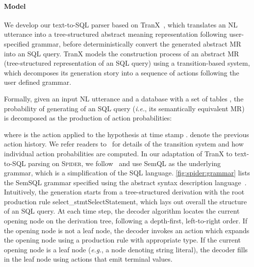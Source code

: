 \documentclass[11pt,a4paper]{article}
\renewcommand{\tt}[1]{\fontfamily{cmtt}\selectfont #1}
\newcommand{\eg}{\hbox{\emph{e.g.}}\xspace}
\newcommand{\ie}{\hbox{\emph{i.e.}}\xspace}
\def\spider/{\textsc{Spider}}
\begin{document}
\paragraph{Model} We develop our text-to-SQL parser based on TranX~\cite{yin18tranx}, which translates an NL utterance into a tree-structured abstract meaning representation following user-specified grammar, before deterministically convert the generated abstract MR into an SQL query. TranX models the construction process of an abstract MR (tree-structured representation of an SQL query) using a transition-based system, which decomposes its generation story into a sequence of actions following the user defined grammar.

Formally, given an input NL utterance  and a database with a set of tables , the probability of generating of an SQL query (\ie, its semantically equivalent MR) 
 is decomposed as the production of action probabilities:

where  is the action applied to the hypothesis at time stamp .  denote the previous action history. 
We refer readers to~\citet{yin18tranx} for details of the transition system and how individual action probabilities are computed. 
In our adaptation of TranX to text-to-SQL parsing on \spider/, 
we follow~\citet{Guo2019TowardsCT} and use SemQL as the underlying grammar, which is a simplification of the SQL language. 
\autoref{fig:spider:grammar} lists the SemSQL grammar specified using the abstract syntax description language~\cite{wang97asdl}.
Intuitively, the generation starts from a tree-structured derivation with the root production rule {\tt select\_stmt}{\tt SelectStatement}, which lays out overall the structure of an SQL query.
At each time step, the decoder algorithm locates the current opening node on the derivation tree, following a depth-first, left-to-right order.
If the opening node is not a leaf node, the decoder invokes an action  which expands the opening node using a production rule with appropriate type.
If the current opening node is a leaf node (\eg, a node denoting string literal),
the decoder fills in the leaf node using actions that emit terminal values.


\newcommand*{\Comment}[1]{\hfill\makebox[8.0cm][l]{\textcolor{red}{\# #1}}}
\end{document}
